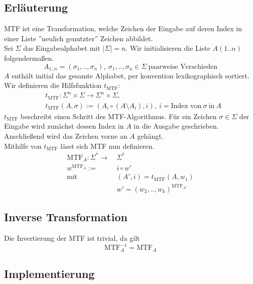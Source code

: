 \documentclass{article}
\begin{document}
\subsection{Erläuterung}
MTF ist eine Transformation, welche Zeichen der Eingabe auf deren Index in einer Liste ''neulich genutzter'' Zeichen abbildet.
\\[.5cm]
Sei $\Sigma$ das Eingabealphabet mit $|\Sigma|=n$. Wir initialisieren die Liste $A(1..n)$ folgendermaßen.
\begin{equation}
    A_{1..n}=(\sigma_1,..,\sigma_n),~\sigma_1,..,\sigma_n\in\Sigma~\text{paarweise Verschieden}
\end{equation}
$A$ enthält initial das gesamte Alphabet, per konvention lexikographisch sortiert.
\\[.5cm]
Wir definieren die Hilfsfunktion $t_{\text{MTF}}$:
\begin{equation}
\begin{split}
    &t_{\text{MTF}}:\Sigma^n\times\Sigma\rightarrow\Sigma^n\times\Sigma,\\
    &t_{\text{MTF}}(A,\sigma):=(A_i\circ(A\setminus A_i),i),~i=\text{Index von}~\sigma~\text{in}~A
\end{split}
\end{equation}
$t_{\text{MTF}}$ beschreibt einen Schritt des MTF-Algorithmus. Für ein Zeichen $\sigma\in\Sigma$ der Eingabe wird zunächst dessen Index in $A$ in die Ausgabe geschrieben. Anschließend wird das Zeichen vorne an $A$ gehängt.
\\[.5cm]
Mithilfe von $t_{\text{MTF}}$ lässt sich MTF nun definieren.
\begin{equation}
\begin{split}
    \text{MTF}_A:\Sigma^*\rightarrow~&\Sigma^*\\
    w^{\text{MTF}_A}:=~&i\circ w'\\
    \text{mit}~&(A',i)=t_{\text{MTF}}(A,w_1)\\
    &w'=(w_2,..,w_k)^{\text{MTF}_{A'}}
\end{split}
\end{equation}
\newpage
\subsection{Inverse Transformation}
Die Invertierung der MTF ist trivial, da gilt
\begin{equation}
    \text{MTF}_A^{-1}=\text{MTF}_A
\end{equation}
\subsection{Implementierung}
\end{document}
